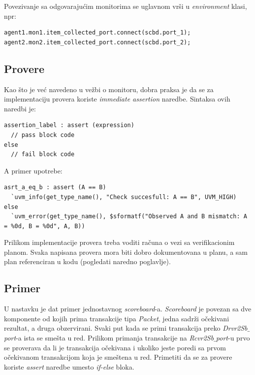 

Povezivanje sa odgovarajućim monitorima se uglavnom vrši u \emph{environment}
klasi, npr:

\begin{lstlisting}
agent1.mon1.item_collected_port.connect(scbd.port_1);
agent2.mon2.item_collected_port.connect(scbd.port_2);
\end{lstlisting}


\subsection{Provere}

Kao što je već navedeno u vežbi o monitoru, dobra praksa je da se za
implementaciju provera koriste \emph{immediate assertion} naredbe. Sintaksa ovih
naredbi je:

\begin{lstlisting}
assertion_label : assert (expression)
  // pass block code
else
  // fail block code
\end{lstlisting}

A primer upotrebe:

\begin{lstlisting}
asrt_a_eq_b : assert (A == B)
  `uvm_info(get_type_name(), "Check succesfull: A == B", UVM_HIGH)
else
  `uvm_error(get_type_name(), $sformatf("Observed A and B mismatch: A = %0d, B = %0d", A, B))
\end{lstlisting}

Prilikom implementacije provera treba voditi računa o vezi sa verifikacionim
planom. Svaka napisana provera mora biti dobro dokumentovana u planu, a sam plan
referenciran u kodu (pogledati naredno poglavlje).


\subsection{Primer}

U nastavku je dat primer jednostavnog \emph{scoreboard}-a. \emph{Scoreboard} je
povezan sa dve komponente od kojih prima transakcije tipa \emph{Packet}, jedna
sadrži očekivani rezultat, a druga obzervirani. Svaki put kada se primi
transakcija preko \emph{Drvr2Sb\(\_\)port}-a ista se smešta u red. Prilikom
primanja transakcije na \emph{Rcvr2Sb\(\_\)port}-u prvo se proverava da li je
transakcija očekivana i ukoliko jeste poredi sa prvom očekivanom transakcijom
koja je smeštena u red. Primetiti da se za provere koriste \emph{assert} naredbe
umesto \emph{if-else} bloka.

